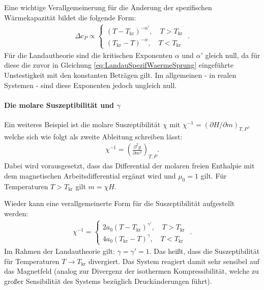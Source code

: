 Eine wichtige Verallgemeinerung für die Änderung der spezifischen Wärmekapazität bildet die folgende Form:
\begin{align}
    \label{eq:AllgSpezifWaermeSprung}
    \boxed{
        \Delta c_P \propto \left\{ 
            \begin{aligned}
                \left(T-T_\mathrm{kr}\right)^{-\alpha'}, \quad T>T_\mathrm{kr}\\
                \left(T_\mathrm{kr}-T\right)^{-\alpha}, \quad T<T_\mathrm{kr}
            \end{aligned}
        \right.
    }\;.
\end{align}
Für die Landautheorie sind die kritischen Exponenten $\alpha$ und $\alpha'$ gleich null, da für diese die zuvor in Gleichung \ref{eq:LandauSpezifWaermeSprung} eingeführte Unstestigkeit mit den konstanten Beträgen gilt.
Im allgemeinen - in realen Systemen - sind diese Exponenten jedoch ungleich null.

\paragraph*{Die molare Suszeptibilität und $\gamma$}
Ein weiteres Beispiel ist die molare Suszeptibilität $\chi$ mit ${\chi^{-1}=\left(\partial H/\partial m\right)_{T,P}}$, welche sich wie folgt als zweite Ableitung schreiben lässt:
\begin{align*}
    \chi^{-1}=\left(\frac{\partial^2g}{\partial m^2}\right)_{T,P}.
\end{align*}
Dabei wird vorausgesetzt, dass das Differential der molaren freien Enthalpie mit dem magnetischen Arbeitsdifferential ergänzt wird und $\mu_0=1$ gilt. Für Temperaturen $T>T_\mathrm{kr}$ gilt $m=\chi H$.

Wieder kann eine verallgemeinerte Form für die Suszeptibilität aufgestellt werden:
\begin{align*}
    \boxed{\chi^{-1}=\left\{ 
        \begin{aligned}
            2a_0\left(T-T_\mathrm{kr}\right)^{\gamma'}, \quad T>T_\mathrm{kr}\\
            4a_0\left(T_\mathrm{kr}-T\right)^{\gamma}, \quad T<T_\mathrm{kr}
        \end{aligned}
    \right.}\;.
\end{align*}
Im Rahmen der Landautheorie gilt: $\gamma=\gamma'=1$. Das heißt, dass die Suszeptibilität für Temperaturen $T\rightarrow T_\mathrm{kr}$ divergiert. Das System reagiert damit sehr sensibel auf das Magnetfeld (analog zur Divergenz der isothermen Kompressibilität, welche zu großer Sensibilität des Systems bezüglich Druckänderungen führt). 


